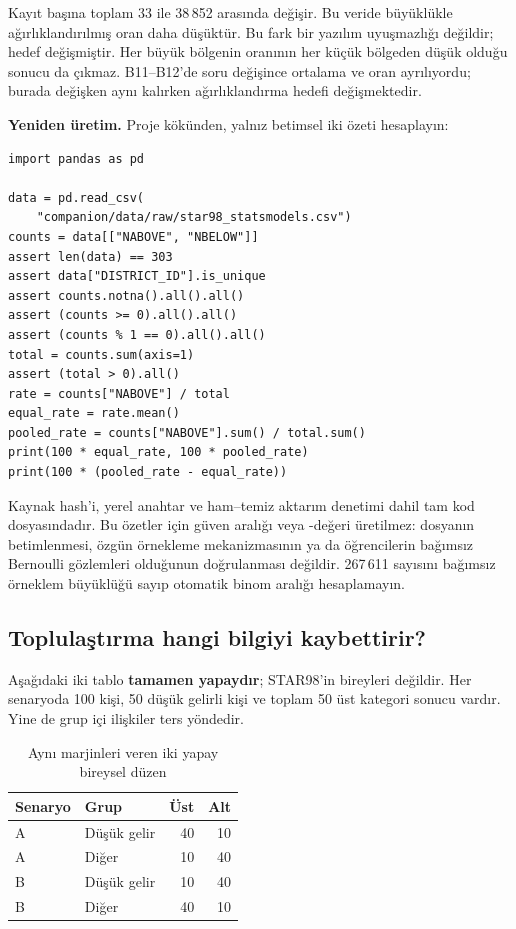 Kayıt başına toplam 33 ile 38\,852 arasında değişir. Bu veride büyüklükle
ağırlıklandırılmış oran daha düşüktür. Bu fark bir yazılım uyuşmazlığı
değildir; hedef değişmiştir. Her büyük bölgenin oranının her küçük
bölgeden düşük olduğu sonucu da çıkmaz. B11--B12'de soru değişince
ortalama ve oran ayrılıyordu; burada değişken aynı kalırken ağırlıklandırma
hedefi değişmektedir.

\noindent\begin{minipage}{\linewidth}
\textbf{Yeniden üretim.} Proje kökünden, yalnız betimsel iki özeti hesaplayın:
\begin{lstlisting}[style=prismPythonApp]
import pandas as pd

data = pd.read_csv(
    "companion/data/raw/star98_statsmodels.csv")
counts = data[["NABOVE", "NBELOW"]]
assert len(data) == 303
assert data["DISTRICT_ID"].is_unique
assert counts.notna().all().all()
assert (counts >= 0).all().all()
assert (counts % 1 == 0).all().all()
total = counts.sum(axis=1)
assert (total > 0).all()
rate = counts["NABOVE"] / total
equal_rate = rate.mean()
pooled_rate = counts["NABOVE"].sum() / total.sum()
print(100 * equal_rate, 100 * pooled_rate)
print(100 * (pooled_rate - equal_rate))
\end{lstlisting}
\end{minipage}

Kaynak hash'i, yerel anahtar ve ham--temiz aktarım denetimi dahil tam kod
 dosyasındadır.
Bu özetler için güven aralığı veya \pval-değeri üretilmez: dosyanın
betimlenmesi, özgün örnekleme mekanizmasının ya da öğrencilerin bağımsız
Bernoulli gözlemleri olduğunun doğrulanması değildir. 267\,611 sayısını
bağımsız örneklem büyüklüğü sayıp otomatik binom aralığı hesaplamayın.

\subsection*{Toplulaştırma hangi bilgiyi kaybettirir?}

Aşağıdaki iki tablo \textbf{tamamen yapaydır}; STAR98'in bireyleri değildir.
Her senaryoda 100 kişi, 50 düşük gelirli kişi ve toplam 50 üst kategori
sonucu vardır. Yine de grup içi ilişkiler ters yöndedir.

\begin{table}[H]
\centering
\small
\caption{Aynı marjinleri veren iki yapay bireysel düzen}
\label{tab:v4-yapay}
\begin{tabular}{@{}llrr@{}}
\toprule
Senaryo & Grup & Üst & Alt \\
\midrule
A & Düşük gelir & 40 & 10 \\
A & Diğer & 10 & 40 \\
B & Düşük gelir & 10 & 40 \\
B & Diğer & 40 & 10 \\
\bottomrule
\end{tabular}
\end{table}

